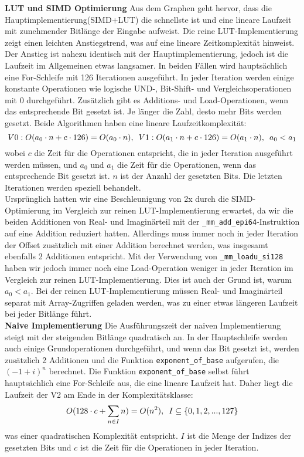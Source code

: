 \documentclass[course=erap]{aspdoc}
\begin{document}
\noindent
\textbf{LUT und SIMD Optimierung}
Aus dem Graphen geht hervor, dass die Hauptimplementierung(SIMD+LUT) die schnellste ist und eine lineare Laufzeit mit zunehmender Bitlänge der Eingabe aufweist. Die reine LUT-Implementierung zeigt einen leichten Anstiegstrend, was auf eine lineare Zeitkomplexität hinweist. Der Anstieg ist nahezu identisch mit der Hauptimplementierung, jedoch ist die Laufzeit im Allgemeinen etwas langsamer. In beiden Fällen wird hauptsächlich eine For-Schleife mit 126 Iterationen ausgeführt. In jeder Iteration werden einige konstante Operationen wie logische UND-, Bit-Shift- und Vergleichsoperationen mit 0 durchgeführt. Zusätzlich gibt es Additions- und Load-Operationen, wenn das entsprechende Bit gesetzt ist. Je länger die Zahl, desto mehr Bits werden gesetzt. Beide Algorithmen haben eine lineare Laufzeitkomplexität:
$$V0: O(a_0 \cdot n + c \cdot 126)=O(a_0 \cdot n),\hspace{0.5em}V1: O(a_1 \cdot n + c \cdot 126)=O(a_1  \cdot n),\hspace{0.5em}a_0<a_1$$
wobei $c$ die Zeit für die Operationen entspricht, die in jeder Iteration ausgeführt werden müssen, und $a_0$ und $a_1$ die Zeit für die Operationen, wenn das entsprechende Bit gesetzt ist. $n$ ist der Anzahl der gesetzten Bits. Die letzten Iterationen werden speziell behandelt.\\
Ursprünglich hatten wir eine Beschleunigung von 2x durch die SIMD-Optimierung im Vergleich zur reinen LUT-Implementierung erwartet, da wir die beiden Additionen von Real- und Imaginärteil mit der \texttt{\_mm\_add\_epi64}-Instruktion auf eine Addition reduziert hatten. Allerdings muss immer noch in jeder Iteration der Offset zusätzlich mit einer Addition berechnet werden, was insgesamt ebenfall\textbf{}s 2 Additionen entspricht. Mit der Verwendung von \texttt{\_mm\_loadu\_si128} haben wir jedoch immer noch eine Load-Operation weniger in jeder Iteration im Vergleich zur reinen LUT-Implementierung. Dies ist auch der Grund ist, warum $a_0 < a_1$. Bei der reinen LUT-Implementierung müssen Real- und Imaginärteil separat mit Array-Zugriffen geladen werden, was zu einer etwas längeren Laufzeit bei jeder Bitlänge führt. \\
\textbf{Naive Implementierung} Die Ausführungszeit der naiven Implementierung steigt mit der steigenden Bitlänge quadratisch an. In der Hauptschleife werden auch einige Grundoperationen durchgeführt, und wenn das Bit gesetzt ist, werden zusätzlich 2 Additionen und die Funktion \texttt{exponent\_of\_base} aufgerufen, die $(-1+i)^n$ berechnet. Die Funktion \texttt{exponent\_of\_base} selbst führt hauptsächlich eine For-Schleife aus, die eine lineare Laufzeit hat. Daher liegt die Laufzeit der V2 am Ende in der Komplexitätsklasse:
$$O(128 \cdot c + \sum_{n\in I} n) = O(n^2), \hspace{0.5em}I\subseteq \{0, 1, 2, ..., 127\}$$
was einer quadratischen Komplexität entspricht. $I$ ist die Menge der Indizes der gesetzten Bits und $c$ ist die Zeit für die Operationen in jeder Iteration.
\end{document}
